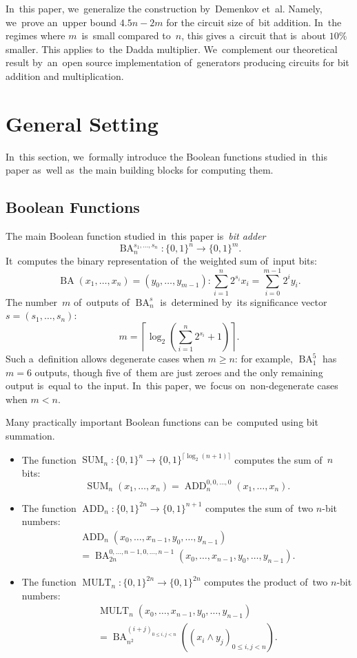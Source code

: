 \documentclass[sigconf, review, anonymous]{acmart}
\DeclareMathOperator{\SUM}{SUM}
\DeclareMathOperator{\ADD}{ADD}
\DeclareMathOperator{\MULT}{MULT}
\DeclareMathOperator{\BA}{BA}
\begin{document}
In~this paper, we~generalize the construction by~Demenkov et~al.
Namely, we~prove an~upper bound $4.5n-2m$
for the circuit size of~bit addition.
In~the regimes where $m$~is~small
compared to~$n$, this gives a~circuit that is~about $10\%$ smaller.
This applies to~the Dadda multiplier.
We~complement our theoretical result by~an~open source implementation
of~generators producing circuits for bit addition and multiplication.

\section{General Setting}
In~this section,
we~formally introduce the Boolean functions
studied in~this paper as~well as~the main building blocks
for computing them.

\subsection{Boolean Functions}
The main Boolean function studied in~this paper
is~\emph{bit adder}
\[\BA_n^{s_1, \dotsc, s_n} \colon \{0,1\}^n \to \{0,1\}^m.\]
It~computes the binary representation of~the weighted sum of~input bits:
\[\BA(x_1, \dotsc, x_n)=(y_0, \dotsc, y_{m-1}) \colon \sum_{i=1}^{n}2^{s_i}x_i=\sum_{i=0}^{m-1}2^iy_i.\]
The number~$m$ of~outputs of $\BA_n^s$ is~determined by~its significance vector $s=(s_1, \dotsc, s_n)$:
\[m=\left\lceil \log_2\left( \sum_{i=1}^{n}2^{s_i} + 1\right) \right\rceil.\]
Such a~definition allows degenerate cases when $m \ge n$: for example, $\BA_1^{5}$ has
$m=6$ outputs, though five of~them are just zeroes and the only remaining output is~equal
to~the input. In~this paper, we~focus on~non-degenerate cases when $m<n$.


Many practically important Boolean functions can be~computed using bit summation.
\begin{itemize}
    \item The function $\SUM_n \colon \{0,1\}^n \to \{0,1\}^{\lceil \log_2(n+1) \rceil}$
    computes the sum of~$n$ bits: \[\SUM_n(x_1, \dotsc, x_n)=\ADD_n^{0,0,\dotsc,0}(x_1, \dotsc, x_n).\]
	\item The function $\ADD_n \colon \{0,1\}^{2n} \to \{0,1\}^{n+1}$ computes the sum
	of~two $n$-bit numbers:
    \begin{multline*}
        \ADD_n(x_0, \dotsc, x_{n-1}, y_0, \dotsc, y_{n-1})\\
        =\BA_{2n}^{0,\dotsc,n-1,0,\dotsc,n-1}(x_0, \dotsc, x_{n-1}, y_0, \dotsc, y_{n-1}).
    \end{multline*}
	\item The function $\MULT_n \colon \{0,1\}^{2n} \to \{0,1\}^{2n}$ computes the product
	of~two $n$-bit numbers:
	\begin{multline*}
	\MULT_n(x_0, \dotsc, x_{n-1}, y_0, \dotsc, y_{n-1})\\=\BA_{n^2}^{(i+j)_{0 \le i, j < n}}\left(\left(x_i \land y_j\right)_{0 \le i, j < n}\right).
	\end{multline*}
\end{itemize}
\end{document}
